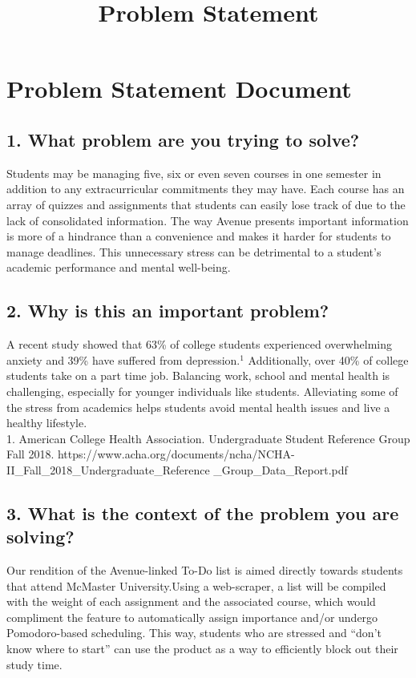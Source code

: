 \documentclass[11pt, oneside]{article}   	%
\title{Problem Statement}
\author{}
\begin{document}
\marginpar{}
\section*{Problem Statement Document}
\subsection*{1. What problem are you trying to solve?}

Students may be managing five, six or even seven courses in one semester in addition to any extracurricular commitments they may have. Each course has an array of quizzes and assignments that students can easily lose track of due to the lack of consolidated information. The way Avenue presents important information is more of a hindrance than a convenience and makes it harder for students to manage deadlines. This unnecessary stress can be detrimental to a student's academic performance and mental well-being.

\subsection*{2. Why is this an important problem?}

A recent study showed that 63\% of college students experienced overwhelming anxiety and 39\% have suffered from depression.$^1$ Additionally, over 40\% of college students take on a part time job. Balancing work, school and mental health is challenging, especially for younger individuals like students. Alleviating some of the stress from academics helps students avoid mental health issues and live a healthy lifestyle.\\

1. American College Health Association. Undergraduate Student Reference Group Fall 2018. https://www.acha.org/documents/ncha/NCHA-II\_Fall\_2018\_Undergraduate\_Reference \_Group\_Data\_Report.pdf 


\subsection*{3. What is the context of the problem you are solving?}
 
Our rendition of the Avenue-linked To-Do list is aimed directly towards students that attend McMaster University.Using a web-scraper, a list will be compiled with the weight of each assignment and the associated course, which would compliment the feature to automatically assign importance and/or undergo Pomodoro-based scheduling. This way, students who are stressed and “don’t know where to start” can use the product as a way to efficiently block out their study time.\\
\end{document}
